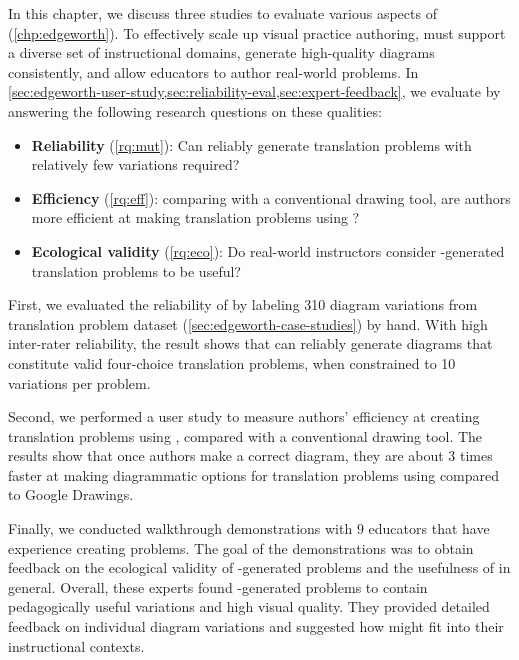 In this chapter, we discuss three studies to evaluate various aspects of \Edgeworth (\cref{chp:edgeworth}). To effectively scale up visual practice authoring, \Edgeworth must support a diverse set of instructional domains, generate high-quality diagrams consistently, and allow educators to author real-world problems. In \cref{sec:edgeworth-user-study,sec:reliability-eval,sec:expert-feedback}, we evaluate \Edgeworth by answering the following research questions on these qualities:



\begin{itemize}
    \item\textbf{Reliability} (\ref{rq:mut}): Can \Edgeworth reliably generate translation problems with relatively few variations required?
    \item\textbf{Efficiency} (\ref{rq:eff}): comparing with a conventional drawing tool, are authors more efficient at making translation problems using \Edgeworth? 
    \item\textbf{Ecological validity} (\ref{rq:eco}): Do real-world instructors consider \Edgeworth-generated translation problems to be useful? 
\end{itemize}

First, we evaluated the reliability of \Edgeworth by labeling 310 diagram variations from translation problem dataset (\cref{sec:edgeworth-case-studies}) by hand. With high inter-rater reliability, the result shows that \Edgeworth can reliably generate diagrams that constitute valid four-choice translation problems, when constrained to 10 variations per problem.

Second, we performed a user study to measure authors' efficiency at creating translation problems using \Edgeworth, compared with a conventional drawing tool. The results show that once authors make a correct diagram, they are about 3 times faster at making diagrammatic options for translation problems using \Edgeworth compared to Google Drawings. 

Finally, we conducted walkthrough demonstrations with 9 educators that have experience creating problems. The goal of the demonstrations was to obtain feedback on the ecological validity of \Edgeworth-generated problems and the usefulness of \Edgeworth in general. Overall, these experts found \Edgeworth-generated problems to contain pedagogically useful variations and high visual quality. They provided detailed feedback on individual diagram variations and suggested how \Edgeworth might fit into their instructional contexts. 

